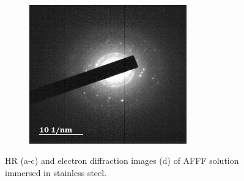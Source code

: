 \documentclass[12pt]{report}
\begin{document}
\begin{figure}[H]
\hspace{-1em}
\begin{subfigure}{.45\textwidth}
    \includegraphics[height=6cm, width=\textwidth]{afff_solution_immersed_in_stainless_steel.png}
\end{subfigure}

\caption{HR (a-c) and electron diffraction images (d) of AFFF solution immersed in stainless steel.}
\label{ch5:figure:stainless_steel_images}
\end{figure}
\end{document}

